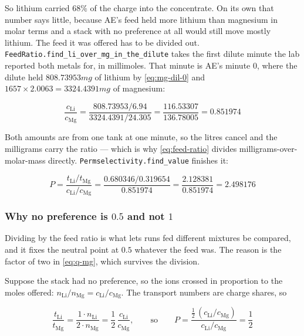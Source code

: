 So lithium carried $68\%$ of the charge into the concentrate. On its own that number says
little, because AE's feed held more lithium than magnesium in molar terms and a stack with no
preference at all would still move mostly lithium. The feed it was offered has to be divided
out. \texttt{FeedRatio.find\_li\_over\_mg\_in\_the\_dilute} takes the first dilute minute the
lab reported both metals for, in millimoles. That minute is AE's minute 0, where the dilute
held $808.73953\unit{mg}$ of lithium by \eqref{eq:mg-dil-0} and
$1657 \times 2.0063 = 3324.4391\unit{mg}$ of magnesium:

\begin{equation}
  \frac{c_{\mathrm{Li}}}{c_{\mathrm{Mg}}}
  = \frac{808.73953 / 6.94}{3324.4391 / 24.305}
  = \frac{116.53307}{136.78005} = 0.851974
  \label{eq:feed-ratio}
\end{equation}

Both amounts are from one tank at one minute, so the litres cancel and the milligrams carry
the ratio --- which is why \eqref{eq:feed-ratio} divides milligrams-over-molar-mass directly.
\texttt{Permselectivity.\allowbreak find\_value} finishes it:

\begin{equation}
  P = \frac{t_{\mathrm{Li}} / t_{\mathrm{Mg}}}{c_{\mathrm{Li}} / c_{\mathrm{Mg}}}
    = \frac{0.680346 / 0.319654}{0.851974}
    = \frac{2.128381}{0.851974} = 2.498176
  \label{eq:permselectivity}
\end{equation}

\subsubsection*{Why no preference is $0.5$ and not $1$}

Dividing by the feed ratio is what lets runs fed different mixtures be compared, and it fixes
the neutral point at $0.5$ whatever the feed was. The reason is the factor of two in
\eqref{eq:q-mg}, which survives the division.

Suppose the stack had no preference, so the ions crossed in proportion to the moles offered:
$n_{\mathrm{Li}} / n_{\mathrm{Mg}} = c_{\mathrm{Li}} / c_{\mathrm{Mg}}$. The transport numbers
are charge shares, so

\begin{equation}
  \frac{t_{\mathrm{Li}}}{t_{\mathrm{Mg}}}
  = \frac{1 \cdot n_{\mathrm{Li}}}{2 \cdot n_{\mathrm{Mg}}}
  = \frac{1}{2}\,\frac{c_{\mathrm{Li}}}{c_{\mathrm{Mg}}},
  \qquad\text{so}\qquad
  P = \frac{\tfrac{1}{2}\,(c_{\mathrm{Li}} / c_{\mathrm{Mg}})}{c_{\mathrm{Li}} / c_{\mathrm{Mg}}}
    = \frac{1}{2}
  \label{eq:neutral-point}
\end{equation}


